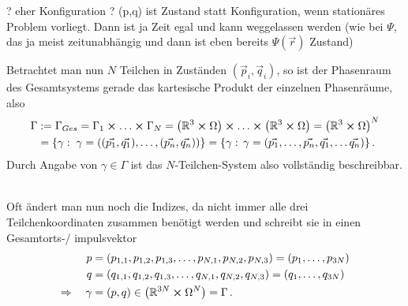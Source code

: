 \documentclass[../class_mech_main.tex]{subfiles}
\begin{document}
? eher Konfiguration ? (p,q) ist Zustand statt Konfiguration, wenn stationäres Problem vorliegt. Dann ist ja Zeit egal und kann weggelassen werden (wie bei $\Psi$, das ja meist zeitunabhängig und dann ist eben bereits $\Psi(\vec{r})$ Zustand)



Betrachtet man nun $N$ Teilchen in Zuständen $(\vec{p}_i, \vec{q}_i)$, so ist der Phasenraum des Gesamtsystems gerade das kartesische Produkt der einzelnen Phasenräume, also
\begin{equation}
\begin{split}
\Gamma &:= \Gamma_{Ges} = \Gamma_1 \cross \dots \cross \Gamma_N = \qty(\mathbb{R}^3 \cross \Omega) \cross \dots \cross \qty(\mathbb{R}^3 \cross \Omega) = \qty(\mathbb{R}^3 \cross \Omega)^N
\\
&= \qty{\gamma: \; \gamma = \qty((\vec{p_1}, \vec{q_1}), \dots, (\vec{p_n}, \vec{q_n}))} = \qty{\gamma: \, \gamma = \qty(\vec{p_1}, \dots, \vec{p_n}, \vec{q_1}, \dots \vec{q_n})} \, .
\end{split}
\end{equation}
Durch Angabe von $\gamma \in \Gamma$ ist das $N$-Teilchen-System also vollständig beschreibbar.

	\\

Oft ändert man nun noch die Indizes, da nicht immer alle drei Teilchenkoordinaten zusammen benötigt werden und schreibt sie in einen Gesamtorts-/ impulsvektor
\begin{align}
p &= (p_{1,1}, p_{1,2}, p_{1,3}, \dots, p_{N,1}, p_{N,2}, p_{N,3}) = (p_1, \dots, p_{3N})
\\
q &= (q_{1,1}, q_{1,2}, q_{1,3}, \dots, q_{N,1}, q_{N,2}, q_{N,3}) = (q_1, \dots, q_{3N})
\\
\Rightarrow \quad \gamma &= (p, q) \in \qty(\mathbb{R}^{3N} \cross \Omega^{N}) = \Gamma \, .
\end{align}
\end{document}
